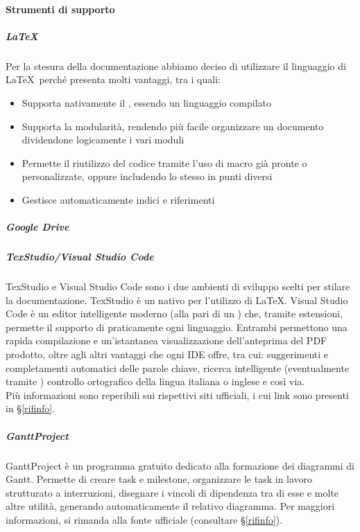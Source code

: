 			\paragraph{Strumenti di supporto}

			\subparagraph{\LaTeX} \label{LaTeX}
			Per la stesura della documentazione abbiamo deciso di utilizzare il linguaggio di  \LaTeX\ perché presenta molti vantaggi, tra i quali:
			\begin{itemize}
				\item Supporta nativamente il , essendo un linguaggio compilato
				\item Supporta la modularità, rendendo più facile organizzare un documento dividendone logicamente i vari moduli
				\item Permette il riutilizzo del codice tramite l'uso di macro già pronte o personalizzate, oppure includendo lo stesso  in punti diversi
				\item Gestisce automaticamente indici e riferimenti
			\end{itemize}

			\subparagraph{Google Drive} %

			\subparagraph{TexStudio/Visual Studio Code}
			TexStudio e Visual Studio Code sono i due ambienti di sviluppo scelti per stilare la documentazione.
			TexStudio è un  nativo per l'utilizzo di \LaTeX. Visual Studio Code è un editor intelligente moderno (alla pari di un ) che, tramite
			estensioni, permette il supporto di praticamente ogni linguaggio.
			Entrambi permettono una rapida compilazione e un'istantanea visualizzazione dell'anteprima del PDF prodotto, oltre agli altri vantaggi che ogni IDE offre,
			tra cui: suggerimenti e completamenti automatici delle parole chiave, ricerca intelligente (eventualmente tramite ) controllo ortografico della
			lingua italiana o inglese e così via.\\
			Più informazioni sono reperibili sui rispettivi siti ufficiali, i cui link sono presenti in \S\ref{rifinfo}.

			\subparagraph{GanttProject}
			GanttProject è un programma gratuito dedicato alla formazione dei diagrammi di Gantt. Permette di creare task e milestone, organizzare le task in lavoro
			strutturato a interruzioni, disegnare i vincoli di dipendenza tra di esse e molte altre utilità, generando automaticamente il relativo diagramma.
			Per maggiori informazioni, si rimanda alla fonte ufficiale (consultare \S\ref{rifinfo}).

